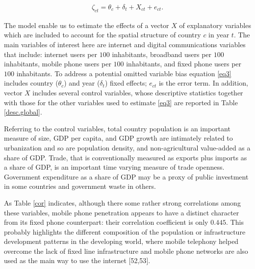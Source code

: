 \documentclass[10pt,letterpaper]{article}
\begin{document}
\color{blue}

\begin{align}
\zeta_{ct} = \theta_{c} + \delta_{t} + X_{ct} + e_{ct}. \label{eq3}
\end{align}

\color{black}

\noindent The model enable us to estimate the effects of a vector \(X\)
of explanatory variables which are included to account for the spatial
structure of country \(c\) in year \(t\). The main variables of interest
here are internet and digital communications variables that include:
internet users per \(100\) inhabitants, broadband users per \(100\)
inhabitants, mobile phone users per \(100\) inhabitants, and fixed phone
users per \(100\) inhabitants. To address a potential omitted variable
bias equation \ref{eq3} includes \color{blue} country (\(\theta_c\)) and
year (\(\delta_t\)) fixed effects; \color{black} \(e_{ct}\) is the error
term. In addition, vector \(X\) includes several control variables,
whose descriptive statistics together with those for the other variables
used to estimate \ref{eq3} are reported in Table \ref{desc.global}.

Referring to the control variables, total country population is an
important measure of size, GDP per capita, and GDP growth are intimately
related to urbanization and so are population density, and
non-agricultural value-added as a share of GDP. Trade, that is
conventionally measured as exports plus imports as a share of GDP, is an
important time varying measure of trade openness. Government expenditure
as a share of GDP may be a proxy of public investment in some countries
and government waste in others.

\color{blue}

As Table \ref{cor} indicates, although there some rather strong
correlations among these variables, mobile phone penetration appears to
have a distinct character from its fixed phone counterpart: their
correlation coefficient is only \(0.445\). This probably highlights the
different composition of the population or infrastructure development
patterns in the developing world, where mobile telephony helped overcome
the lack of fixed line infrastructure and mobile phone networks are also
used as the main way to use the internet {[}52,53{]}.
\end{document}
